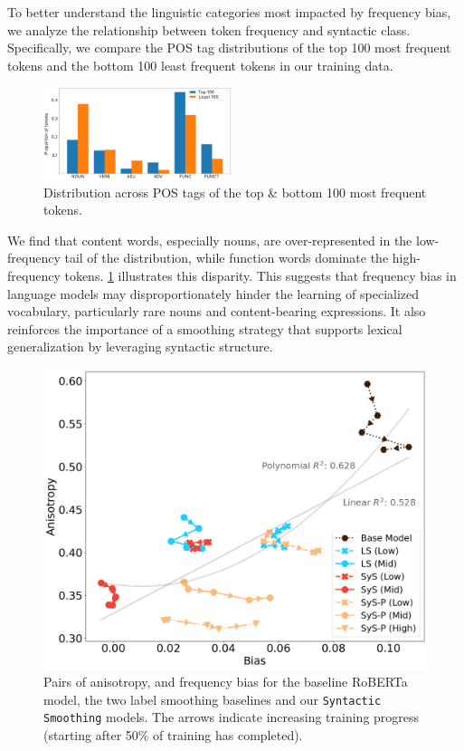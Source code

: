 To better understand the linguistic categories most impacted by frequency bias, we analyze the relationship between token frequency and syntactic class. Specifically, we compare the POS tag distributions of the top 100 most frequent tokens and the bottom 100 least frequent tokens in our training data. 

\begin{figure}
    \centering
    \includegraphics[width=0.49\textwidth]{chapters/syntatic-smoothing/figures/top_versus_bottom_pos_dist.pdf}
    \caption{Distribution across POS tags of the top \& bottom 100 most frequent tokens.}
    \label{fig:top-100-pos-dist}
\end{figure}


We find that content words, especially nouns, are over-represented in the low-frequency tail of the distribution, while function words dominate the high-frequency tokens. \cref{fig:top-100-pos-dist} illustrates this disparity. This suggests that frequency bias in language models may disproportionately hinder the learning of specialized vocabulary, particularly rare nouns and content-bearing expressions. It also reinforces the importance of a smoothing strategy that supports lexical generalization by leveraging syntactic structure.


\begin{figure}[ht!]
    \centering
    \includegraphics[width=0.75\linewidth]{chapters/syntatic-smoothing/figures/bias-vs-anisotropy.png}
    \caption{Pairs of anisotropy, and frequency bias for the baseline RoBERTa model, the two label smoothing baselines and our \texttt{Syntactic Smoothing} models. The arrows indicate increasing training progress (starting after 50\% of training has completed).}
    \label{fig:bias-anisotropy-correlation}
\end{figure}

